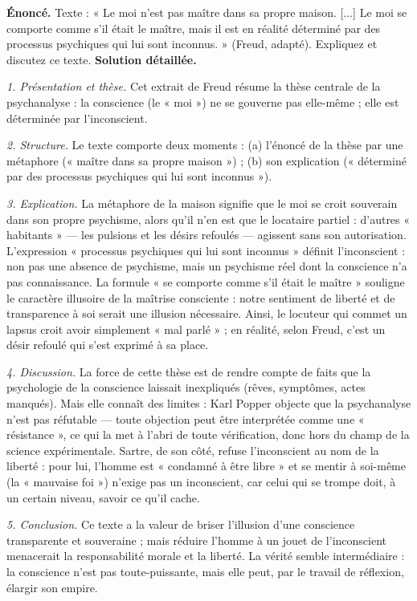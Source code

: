 \documentclass[11pt]{article}
\begin{document}
\begin{exoresolu}
\textbf{Énoncé.} Texte : « Le moi n'est pas maître dans sa propre maison. [...] Le moi se comporte comme s'il était le maître, mais il est en réalité déterminé par des processus psychiques qui lui sont inconnus. » (Freud, adapté). Expliquez et discutez ce texte.
\tcblower
\textbf{Solution détaillée.}

\emph{1. Présentation et thèse.} Cet extrait de Freud résume la thèse centrale de la psychanalyse : la conscience (le « moi ») ne se gouverne pas elle-même ; elle est déterminée par l'inconscient.

\emph{2. Structure.} Le texte comporte deux moments : (a) l'énoncé de la thèse par une métaphore (« maître dans sa propre maison ») ; (b) son explication (« déterminé par des processus psychiques qui lui sont inconnus »).

\emph{3. Explication.} La métaphore de la maison signifie que le moi se croit souverain dans son propre psychisme, alors qu'il n'en est que le locataire partiel : d'autres « habitants » — les pulsions et les désirs refoulés — agissent sans son autorisation. L'expression « processus psychiques qui lui sont inconnus » définit l'inconscient : non pas une absence de psychisme, mais un psychisme réel dont la conscience n'a pas connaissance. La formule « se comporte comme s'il était le maître » souligne le caractère illusoire de la maîtrise consciente : notre sentiment de liberté et de transparence à soi serait une illusion nécessaire. Ainsi, le locuteur qui commet un lapsus croit avoir simplement « mal parlé » ; en réalité, selon Freud, c'est un désir refoulé qui s'est exprimé à sa place.

\emph{4. Discussion.} La force de cette thèse est de rendre compte de faits que la psychologie de la conscience laissait inexpliqués (rêves, symptômes, actes manqués). Mais elle connaît des limites : Karl Popper objecte que la psychanalyse n'est pas réfutable — toute objection peut être interprétée comme une « résistance », ce qui la met à l'abri de toute vérification, donc hors du champ de la science expérimentale. Sartre, de son côté, refuse l'inconscient au nom de la liberté : pour lui, l'homme est « condamné à être libre » et se mentir à soi-même (la « mauvaise foi ») n'exige pas un inconscient, car celui qui se trompe doit, à un certain niveau, savoir ce qu'il cache.

\emph{5. Conclusion.} Ce texte a la valeur de briser l'illusion d'une conscience transparente et souveraine ; mais réduire l'homme à un jouet de l'inconscient menacerait la responsabilité morale et la liberté. La vérité semble intermédiaire : la conscience n'est pas toute-puissante, mais elle peut, par le travail de réflexion, élargir son empire.
\end{exoresolu}
\end{document}
